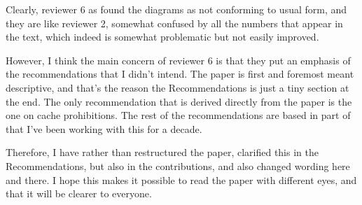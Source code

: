 \documentclass{article}
\begin{document}
Clearly, reviewer 6 as found the diagrams as not conforming to usual
form, and they are like reviewer 2, somewhat confused by all the
numbers that appear in the text, which indeed is somewhat problematic
but not easily improved.

However, I think the main concern of reviewer 6 is that they put an
emphasis of the recommendations that I didn't intend. The paper is
first and foremost meant descriptive, and that's the reason the
Recommendations is just a tiny section at the end. The only
recommendation that is derived directly from the paper is the one on
cache prohibitions. The rest of the recommendations are based in part
of that I've been working with this for a decade.

Therefore, I have rather than restructured the paper, clarified this
in the Recommendations, but also in the contributions, and also
changed wording here and there. I hope this makes it possible to read
the paper with different eyes, and that it will be clearer to
everyone.

%

%
%

\end{document}
